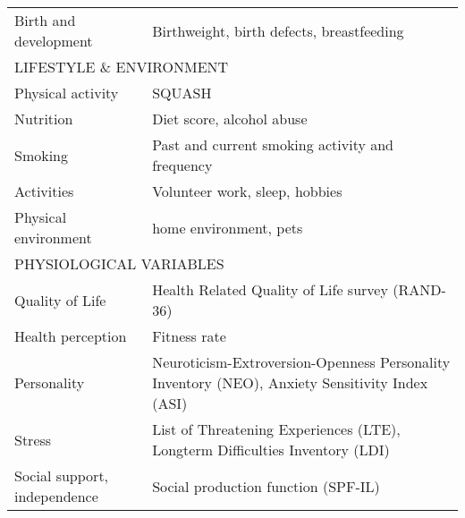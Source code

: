 \begin{table}[H]
{\begin{tabular}{ll}
        Birth and development        & Birthweight, birth defects, breastfeeding                                                      \\
        \multicolumn{2}{l}{LIFESTYLE \& ENVIRONMENT}                                                                                  \\
        Physical activity            & SQUASH \cite{wendel2003reproducibility}                                                                                  \\
        Nutrition                    & Diet score, alcohol abuse                                                                      \\
        Smoking                      & Past and current smoking activity and frequency                                                \\
        Activities                   & Volunteer work, sleep, hobbies                                                                 \\
        Physical environment         & home environment, pets                                                                         \\
        \multicolumn{2}{l}{PHYSIOLOGICAL VARIABLES}                                                                                   \\
        Quality of Life              & Health Related Quality of Life survey (RAND-36)                                                \\
        Health perception            & Fitness rate                                                                                   \\
        Personality                  & Neuroticism-Extroversion-Openness Personality Inventory (NEO), Anxiety Sensitivity Index (ASI) \\
        Stress                       & List of Threatening Experiences (LTE), Longterm Difficulties Inventory (LDI)                   \\
        Social support, independence & Social production function (SPF-IL)                                                           
    \end{tabular}}
    \label{table:appendix:data_overview_baselines}
\end{table}


